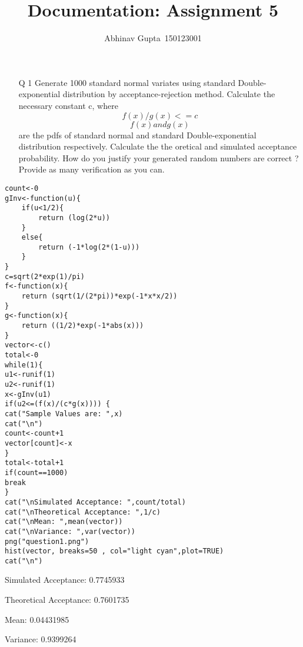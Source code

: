 \documentclass[11pt]{article}
\title{Documentation: Assignment 5}
\author{Abhinav Gupta\
 150123001}
\begin{document}
\titlepage
\newpage

\begin{enumerate}
\item[Q 1] Generate 1000 standard normal variates using standard Double-exponential distribution by acceptance-rejection method. Calculate the necessary constant c, where \[f(x)/g(x)<=c\]\[f(x) and g(x) \]are the pdfs of standard normal and standard Double-exponential distribution respectively. Calculate the the
oretical and simulated acceptance probability. How do you justify your generated random numbers are correct ?
Provide as many verification as you can.
\end{enumerate}


\begin{lstlisting}
count<-0
gInv<-function(u){
	if(u<1/2){
		return (log(2*u))
	}
	else{
		return (-1*log(2*(1-u)))
	}
}
c=sqrt(2*exp(1)/pi)
f<-function(x){
	return (sqrt(1/(2*pi))*exp(-1*x*x/2))
}
g<-function(x){
	return ((1/2)*exp(-1*abs(x)))
}
vector<-c()
total<-0
while(1){
u1<-runif(1)
u2<-runif(1)
x<-gInv(u1)
if(u2<=(f(x)/(c*g(x)))) {
cat("Sample Values are: ",x)
cat("\n")
count<-count+1
vector[count]<-x
}
total<-total+1
if(count==1000)
break
}
cat("\nSimulated Acceptance: ",count/total)
cat("\nTheoretical Acceptance: ",1/c)
cat("\nMean: ",mean(vector))
cat("\nVariance: ",var(vector))
png("question1.png")
hist(vector, breaks=50 , col="light cyan",plot=TRUE)
cat("\n")
\end{lstlisting}


Simulated Acceptance:  0.7745933\

Theoretical Acceptance:  0.7601735\

Mean:  0.04431985\

Variance:  0.9399264\
\end{document}
